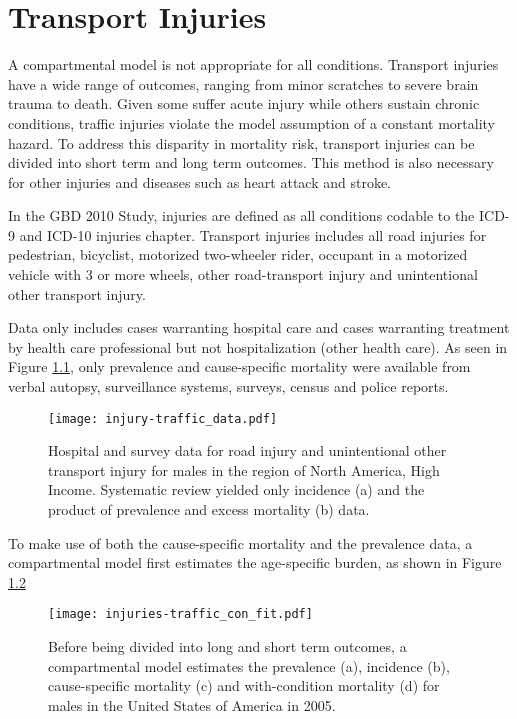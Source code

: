 \chapter{Transport Injuries}
\label{applications-double_dismod}

A compartmental model is not appropriate for all conditions.  Transport injuries have a wide range of outcomes, ranging from minor scratches to severe brain trauma to death.  Given some suffer acute injury while others sustain chronic conditions, traffic injuries violate the model assumption of a constant mortality hazard.  To address this disparity in mortality risk, transport injuries can be divided into short term and long term outcomes.  This method is also necessary for other injuries and diseases such as heart attack and stroke.

In the GBD 2010 Study, injuries are defined as all conditions codable to the ICD-9 and ICD-10 injuries chapter.  Transport injuries includes all road injuries for pedestrian, bicyclist, motorized two-wheeler rider, occupant in a motorized vehicle with 3 or more wheels, other road-transport injury and unintentional other transport injury.

Data only includes cases warranting hospital care and cases warranting treatment by health care professional but not hospitalization (other health care).  As seen in Figure \ref{fig:app-injury traffic data}, only prevalence and cause-specific mortality were available from verbal autopsy, surveillance systems, surveys, census and police reports.

    \begin{figure}[h]
        \begin{center}
            \texttt{[image: injury-traffic\_data.pdf]}
            \caption{Hospital and survey data for road injury and unintentional other transport injury for males in the region of North America, High Income.  Systematic review yielded only incidence (a) and the product of prevalence and excess mortality (b) data.}
            \label{fig:app-injury traffic data}
        \end{center}
    \end{figure}

To make use of both the cause-specific mortality and the prevalence data, a compartmental model first estimates the age-specific burden, as shown in Figure \ref{fig:app-injury traffic fit}

    \begin{figure}[h]
        \begin{center}
            \texttt{[image: injuries-traffic\_con\_fit.pdf]}
            \caption{Before being divided into long and short term outcomes, a compartmental model estimates the prevalence (a), incidence (b), cause-specific mortality (c) and with-condition mortality (d) for males in the United States of America in 2005.}
            \label{fig:app-injury traffic fit}
        \end{center}
    \end{figure}

